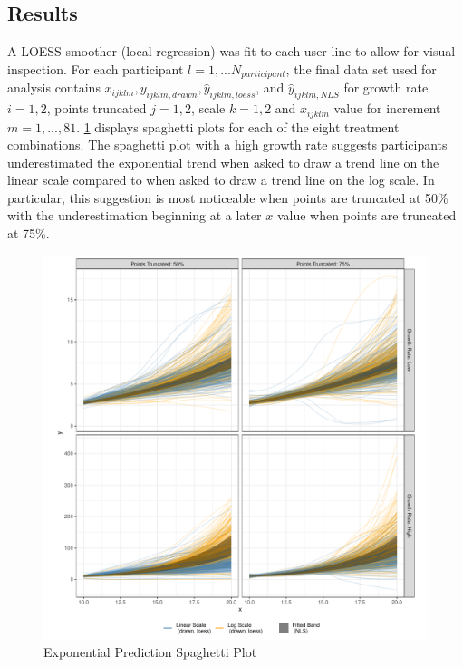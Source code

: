 \documentclass[print]{nuthesis}
\begin{document}
\hypertarget{results-2}{%
\subsection{Results}\label{results-2}}

A LOESS smoother (local regression) was fit to each user line to allow for visual inspection.
For each participant \(l = 1,...N_{participant}\), the final data set used for analysis contains \(x_{ijklm}, y_{ijklm,drawn}, \hat y_{ijklm,loess}\), and \(\hat y_{ijklm,NLS}\) for growth rate \(i = 1,2\), points truncated \(j = 1,2\), scale \(k = 1,2\) and \(x_{ijklm}\) value for increment \(m = 1, ...,81\).
\cref{fig:exponential-yloess-spaghetti-plot} displays spaghetti plots for each of the eight treatment combinations.
The spaghetti plot with a high growth rate suggests participants underestimated the exponential trend when asked to draw a trend line on the linear scale compared to when asked to draw a trend line on the log scale.
In particular, this suggestion is most noticeable when points are truncated at 50\% with the underestimation beginning at a later \(x\) value when points are truncated at 75\%.

\begin{figure}[tbp]

{\centering \includegraphics[width=0.9\linewidth,]{thesis_files/figure-latex/exponential-yloess-spaghetti-plot-1} 

}

\caption{Exponential Prediction Spaghetti Plot}\label{fig:exponential-yloess-spaghetti-plot}
\end{figure}
\end{document}
